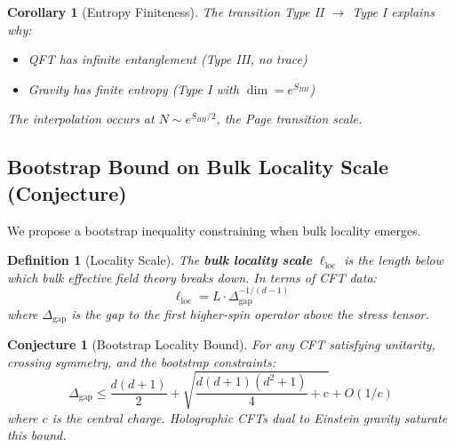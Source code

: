 \documentclass[12pt,a4paper]{article}
\newtheorem{conjecture}[theorem]{Conjecture}
\newtheorem{definition}[theorem]{Definition}
\newtheorem{corollary}[theorem]{Corollary}
\begin{document}
\begin{corollary}[Entropy Finiteness]
The transition Type II $\to$ Type I explains why:
\begin{itemize}
    \item QFT has infinite entanglement (Type III, no trace)
    \item Gravity has finite entropy (Type I with $\dim = e^{S_{BH}}$)
\end{itemize}
The interpolation occurs at $N \sim e^{S_{BH}/2}$, the Page transition scale.
\end{corollary}

\subsection{Bootstrap Bound on Bulk Locality Scale (Conjecture)}

We propose a bootstrap inequality constraining when bulk locality emerges.

\begin{definition}[Locality Scale]
The \textbf{bulk locality scale} $\ell_{\text{loc}}$ is the length below which bulk effective field theory breaks down. In terms of CFT data:
\begin{equation}
\ell_{\text{loc}} = L \cdot \Delta_{\text{gap}}^{-1/(d-1)}
\end{equation}
where $\Delta_{\text{gap}}$ is the gap to the first higher-spin operator above the stress tensor.
\end{definition}

\begin{conjecture}[Bootstrap Locality Bound]
For any CFT satisfying unitarity, crossing symmetry, and the bootstrap constraints:
\begin{equation}
\Delta_{\text{gap}} \leq \frac{d(d+1)}{2} + \sqrt{\frac{d(d+1)(d^2+1)}{4} + c} + O(1/c)
\end{equation}
where $c$ is the central charge. Holographic CFTs dual to Einstein gravity saturate this bound.
\end{conjecture}
\end{document}
